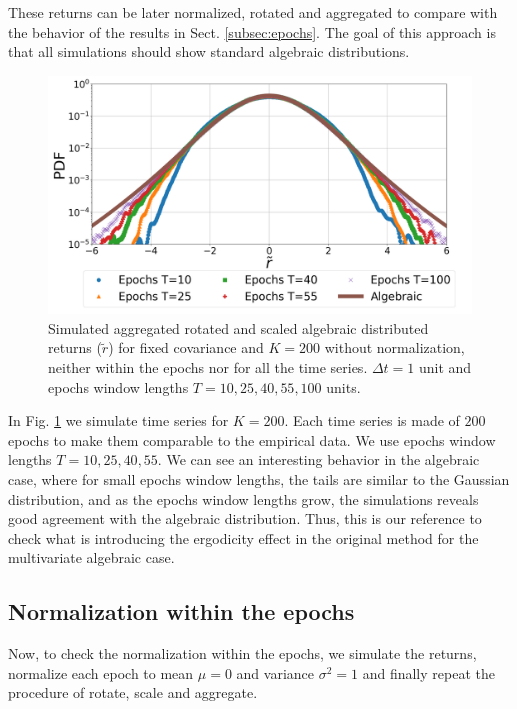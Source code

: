These returns can be later normalized, rotated and aggregated to compare with
the behavior of the results in Sect. \ref{subsec:epochs}.  The goal of this
approach is that all simulations should show standard algebraic distributions.

\begin{figure}[htbp]
    \centering
    \includegraphics[width=0.6\columnwidth]
    {figures/06_epochs_sim_alg_agg_ret_pairs_no_norm.png}
    \caption{Simulated aggregated rotated and scaled algebraic distributed
             returns ($\tilde{r}$) for fixed covariance and $K=200$ without
             normalization, neither within the epochs nor for all the time
             series. $\Delta t = 1$ unit and epochs window  lengths
             $T=10, 25, 40, 55, 100$ units.}
    \label{fig:alg_epochs_agg_ret_pairs_no_norm}
\end{figure}

In Fig. \ref{fig:alg_epochs_agg_ret_pairs_no_norm} we simulate time series for
$K = 200$. Each time series is made of $200$ epochs to make them comparable
to the empirical data. We use epochs window lengths $T = 10, 25, 40, 55$. We
can see an interesting behavior in the algebraic case, where for small epochs
window lengths, the tails are similar to the Gaussian distribution, and as the
epochs window lengths grow, the simulations reveals good agreement with the
algebraic distribution. Thus, this is our reference to check what is
introducing the ergodicity effect in the original method for the multivariate
algebraic case.

\subsection{Normalization within the epochs}
\label{subsec:norm_epochs_sim}

Now, to check the normalization within the epochs, we simulate the returns,
normalize each epoch to mean $\mu = 0$ and variance $\sigma^{2} = 1$ and
finally repeat the procedure of rotate, scale and aggregate.

